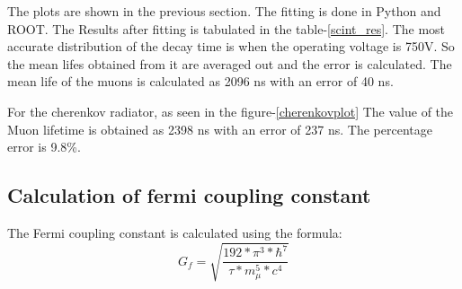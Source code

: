 \documentclass{article}
\begin{document}
\begin{multicols}{2}
The plots are shown in the previous section. The fitting is done in Python and ROOT. The Results after fitting is tabulated in the table-\ref{scint_res}. The most accurate distribution of the decay time is when the operating voltage is 750V. So the mean lifes obtained from it are averaged out and the error is calculated. The mean life of the muons is calculated as 2096 ns with an error of 40 ns.


\begin{table}[ht]
    \centering
    \caption{The results of the fitted data from the Scintillation detector}
    \label{scint_res}
\end{table}


For the cherenkov radiator, as seen in the figure-\ref{cherenkovplot}
The value of the Muon lifetime is obtained as 2398 ns with an error of 237 ns. The percentage error is 9.8\%.


\subsection{Calculation of fermi coupling constant}

The Fermi coupling constant is calculated using the formula:
\begin{equation}
    G_f = \sqrt{\frac{192*\pi^3*\hbar^7}{\tau*m_{\mu}^5*c^4}}
\end{equation}


\end{multicols}
\end{document}

